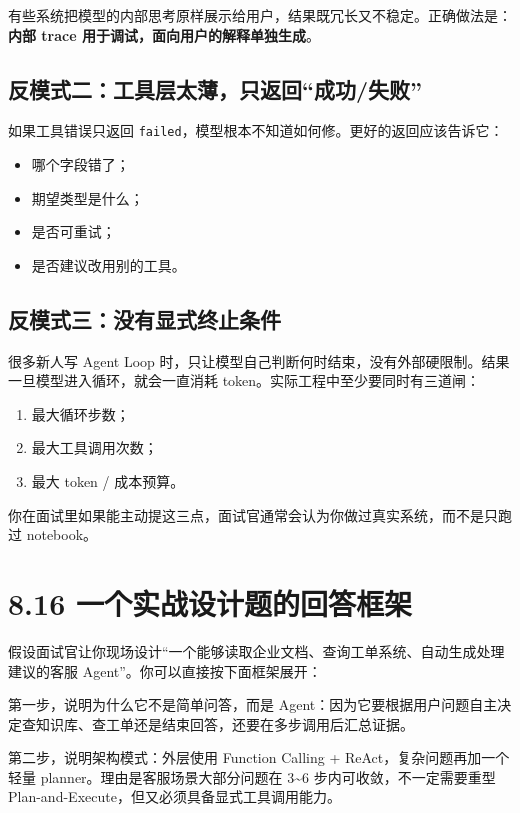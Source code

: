 有些系统把模型的内部思考原样展示给用户，结果既冗长又不稳定。正确做法是：\textbf{内部 trace 用于调试，面向用户的解释单独生成}。


\subsection{反模式二：工具层太薄，只返回``成功/失败''}

如果工具错误只返回 \texttt{failed}，模型根本不知道如何修。更好的返回应该告诉它：


\begin{itemize}[leftmargin=2em]
\item 哪个字段错了；
\item 期望类型是什么；
\item 是否可重试；
\item 是否建议改用别的工具。
\end{itemize}

\subsection{反模式三：没有显式终止条件}

很多新人写 Agent Loop 时，只让模型自己判断何时结束，没有外部硬限制。结果一旦模型进入循环，就会一直消耗 token。实际工程中至少要同时有三道闸：


\begin{enumerate}[leftmargin=2em]
\item 最大循环步数；
\item 最大工具调用次数；
\item 最大 token / 成本预算。
\end{enumerate}

你在面试里如果能主动提这三点，面试官通常会认为你做过真实系统，而不是只跑过 notebook。


\section{8.16 一个实战设计题的回答框架}

假设面试官让你现场设计``一个能够读取企业文档、查询工单系统、自动生成处理建议的客服 Agent''。你可以直接按下面框架展开：


第一步，说明为什么它不是简单问答，而是 Agent：因为它要根据用户问题自主决定查知识库、查工单还是结束回答，还要在多步调用后汇总证据。


第二步，说明架构模式：外层使用 Function Calling + ReAct，复杂问题再加一个轻量 planner。理由是客服场景大部分问题在 3\textasciitilde{}6 步内可收敛，不一定需要重型 Plan-and-Execute，但又必须具备显式工具调用能力。


